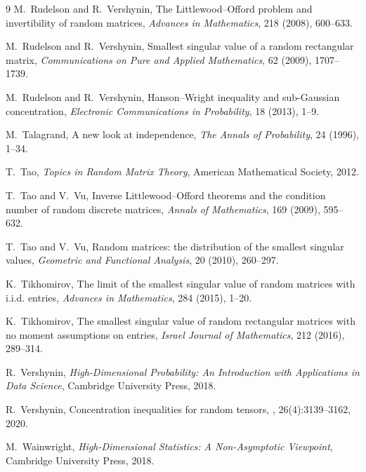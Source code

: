 \documentclass[11pt]{amsart}
\theoremstyle{definition}
\theoremstyle{remark}
\begin{document}
\begin{thebibliography}{9}
M.~Rudelson and R.~Vershynin,
\newblock The Littlewood--Offord problem and invertibility of random matrices,
\newblock \emph{Advances in Mathematics}, 218 (2008), 600--633.

M.~Rudelson and R.~Vershynin,
\newblock Smallest singular value of a random rectangular matrix,
\newblock \emph{Communications on Pure and Applied Mathematics}, 62 (2009), 1707--1739.

M.~Rudelson and R.~Vershynin,
\newblock Hanson--Wright inequality and sub-Gaussian concentration,
\newblock \emph{Electronic Communications in Probability}, 18 (2013), 1--9.

M.~Talagrand,
\newblock A new look at independence,
\newblock \emph{The Annals of Probability}, 24 (1996), 1--34.

T.~Tao,
\newblock \emph{Topics in Random Matrix Theory},
\newblock American Mathematical Society, 2012.

T.~Tao and V.~Vu,
\newblock Inverse Littlewood--Offord theorems and the condition number of random discrete matrices,
\newblock \emph{Annals of Mathematics}, 169 (2009), 595--632.

T.~Tao and V.~Vu,
\newblock Random matrices: the distribution of the smallest singular values,
\newblock \emph{Geometric and Functional Analysis}, 20 (2010), 260--297.

K.~Tikhomirov,
\newblock The limit of the smallest singular value of random matrices with i.i.d. entries,
\newblock \emph{Advances in Mathematics}, 284 (2015), 1--20.

K.~Tikhomirov,
\newblock The smallest singular value of random rectangular matrices with no moment assumptions on entries,
\newblock \emph{Israel Journal of Mathematics}, 212 (2016), 289--314.

R.~Vershynin,
\newblock \emph{High-Dimensional Probability: An Introduction with Applications in Data Science},
\newblock Cambridge University Press, 2018.

R.~Vershynin,
\newblock Concentration inequalities for random tensors,
, 26(4):3139--3162, 2020.

M.~Wainwright,
\newblock \emph{High-Dimensional Statistics: A Non-Asymptotic Viewpoint},
\newblock Cambridge University Press, 2018.

\end{thebibliography}
\end{document}
